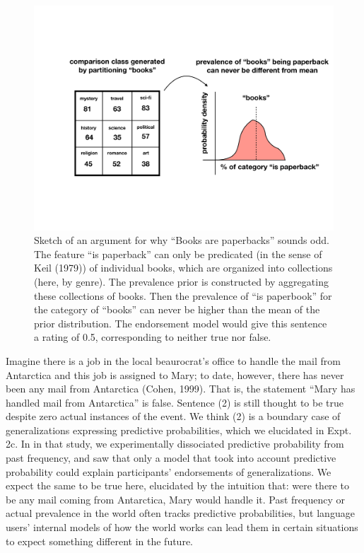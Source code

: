 \documentclass[english,floatsintext,man]{apa6}
\theoremstyle{definition}
\theoremstyle{definition}
\theoremstyle{definition}
\theoremstyle{remark}
\begin{document}
\begin{figure}[htbp]
\centering
\includegraphics{figs/books-paperbacks.pdf}
\caption{\label{fig:booksArePaperbacks}Sketch of an argument for why
\enquote{Books are paperbacks} sounds odd. The feature \enquote{is
paperback} can only be predicated (in the sense of Keil (1979)) of
individual books, which are organized into collections (here, by genre).
The prevalence prior is constructed by aggregating these collections of
books. Then the prevalence of \enquote{is paperbook} for the category of
\enquote{books} can never be higher than the mean of the prior
distribution. The endorsement model would give this sentence a rating of
0.5, corresponding to neither true nor false.}
\end{figure}

Imagine there is a job in the local beaurocrat's office to handle the
mail from Antarctica and this job is assigned to Mary; to date, however,
there has never been any mail from Antarctica (Cohen, 1999). That is,
the statement \enquote{Mary has handled mail from Antarctica} is false.
Sentence (2) is still thought to be true despite zero actual instances
of the event. We think (2) is a boundary case of generalizations
expressing predictive probabilities, which we elucidated in Expt. 2c. In
in that study, we experimentally dissociated predictive probability from
past frequency, and saw that only a model that took into account
predictive probability could explain participants' endorsements of
generalizations. We expect the same to be true here, elucidated by the
intuition that: were there to be any mail coming from Antarctica, Mary
would handle it. Past frequency or actual prevalence in the world often
tracks predictive probabilities, but language users' internal models of
how the world works can lead them in certain situations to expect
something different in the future.
\end{document}
